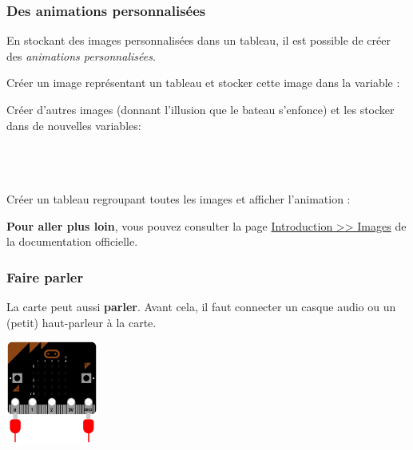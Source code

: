 \subsubsection{Des animations personnalisées}

En stockant des images personnalisées dans un tableau, il est possible de créer des \emph{animations personnalisées}.

\begin{methode}
Créer un image représentant un tableau et stocker cette image dans la variable  :

Créer d'autres images (donnant l'illusion que le bateau s'enfonce) et les stocker dans de nouvelles variables:
\\
\\
\\
\\

Créer un tableau regroupant toutes les images et afficher l'animation :
\end{methode}

\begin{remarque}
\textbf{Pour aller plus loin}, vous pouvez consulter la page  \href{https://microbit-micropython.readthedocs.io/fr/latest/tutorials/images.html}{Introduction >> Images} de la documentation officielle.
\end{remarque}


\subsubsection{Faire parler \mb}

La carte \mb peut aussi \textbf{parler}.
Avant cela, il faut connecter un casque audio ou un (petit) haut-parleur à la carte.

\begin{center}
\includegraphics[width=3cm]{res/mbpy-init-audio.png}    
\end{center}

